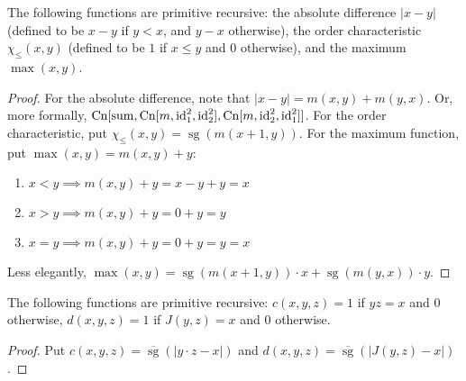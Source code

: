\begin{exercise}[6.3]
  The following functions are primitive recursive: the absolute difference $|x-y|$ (defined to be $x-y$ if $y<x$, and $y-x$ otherwise), the order characteristic $\chi_\le(x,y)$ (defined to be $1$ if $x\le y$ and $0$ otherwise), and the maximum $\max(x,y)$.
\end{exercise}
\begin{proof}
  \newcommand{\rsum}{\operatorname{sum}}
  \newcommand{\sg}{\operatorname{sg}}
  For the absolute difference, note that $|x-y|=m(x,y)+m(y,x)$.
  Or, more formally, $\Cn[\rsum, \Cn[m, \id^2_1, \id^2_2], \Cn[m, \id^2_2, \id^2_1]]$.
  For the order characteristic, put $\chi_\le(x,y) = \sg(m(x+1,y))$.
  For the maximum function, put $\max(x,y) = m(x,y)+y$:
  \begin{enumerate}
    \item $x<y \implies m(x,y)+y=x-y+y=x$
    \item $x>y \implies m(x,y)+y=0+y=y$
    \item $x=y \implies m(x,y)+y=0+y=y=x$
  \end{enumerate}
  Less elegantly, $\max(x,y) = \sg(m(x+1,y)) \cdot x + \sg(m(y,x)) \cdot y$.
\end{proof}

\begin{exercise}[6.4]
  The following functions are primitive recursive: $c(x,y,z)=1$ if $yz=x$ and $0$ otherwise, $d(x,y,z)=1$ if $J(y,z)=x$ and $0$ otherwise.
\end{exercise}
\begin{proof}
  \newcommand{\sgb}{\overline{\operatorname{sg}}}
  Put $c(x,y,z) = \sgb(|y\cdot z - x|)$ and $d(x,y,z) = \sgb(|J(y,z) - x|)$.
\end{proof}

